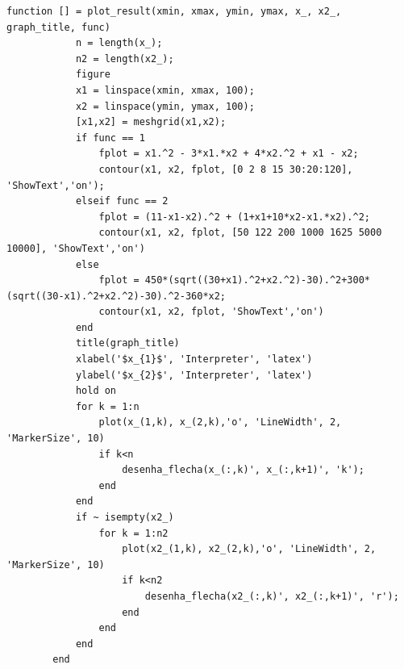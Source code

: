 \documentclass[10pt, a4paper]{article}
\begin{document}
\begin{minipage}{\linewidth}
      \begin{lstlisting}[style=myStyle, caption=script plot\_result.m, label=list_plot_result]
      function [] = plot_result(xmin, xmax, ymin, ymax, x_, x2_, graph_title, func)
            n = length(x_);
            n2 = length(x2_);
            figure
            x1 = linspace(xmin, xmax, 100);
            x2 = linspace(ymin, ymax, 100);
            [x1,x2] = meshgrid(x1,x2);
            if func == 1
                fplot = x1.^2 - 3*x1.*x2 + 4*x2.^2 + x1 - x2;
                contour(x1, x2, fplot, [0 2 8 15 30:20:120], 'ShowText','on');
            elseif func == 2
                fplot = (11-x1-x2).^2 + (1+x1+10*x2-x1.*x2).^2;
                contour(x1, x2, fplot, [50 122 200 1000 1625 5000 10000], 'ShowText','on')
            else
                fplot = 450*(sqrt((30+x1).^2+x2.^2)-30).^2+300*(sqrt((30-x1).^2+x2.^2)-30).^2-360*x2;
                contour(x1, x2, fplot, 'ShowText','on')
            end
            title(graph_title)
            xlabel('$x_{1}$', 'Interpreter', 'latex')
            ylabel('$x_{2}$', 'Interpreter', 'latex')
            hold on
            for k = 1:n
                plot(x_(1,k), x_(2,k),'o', 'LineWidth', 2, 'MarkerSize', 10)
                if k<n
                    desenha_flecha(x_(:,k)', x_(:,k+1)', 'k');
                end
            end
            if ~ isempty(x2_)
                for k = 1:n2
                    plot(x2_(1,k), x2_(2,k),'o', 'LineWidth', 2, 'MarkerSize', 10)
                    if k<n2
                        desenha_flecha(x2_(:,k)', x2_(:,k+1)', 'r');
                    end
                end
            end
        end
      \end{lstlisting}
\end{minipage}



\end{document}
